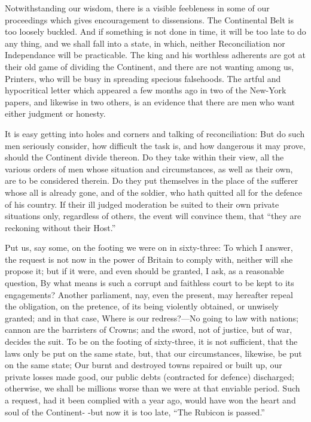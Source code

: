 \documentclass[12pt,oneside]{memoir}
\begin{document}
Notwithstanding our wisdom, there is a visible feebleness in some of our proceedings which gives encouragement to dissensions. The Continental Belt is too loosely buckled. And if something is not done in time, it will be too late to do any thing, and we shall fall into a state, in which, neither Reconciliation nor Independance will be practicable. The king and his worthless adherents are got at their old game of dividing the Continent, and there are not wanting among us, Printers, who will be busy in spreading specious falsehoods. The artful and hypocritical letter which appeared a few months ago in two of the New-York papers, and likewise in two others, is an evidence that there are men who want either judgment or honesty.

It is easy getting into holes and corners and talking of reconciliation: But do such men seriously consider, how difficult the task is, and how dangerous it may prove, should the Continent divide thereon. Do they take within their view, all the various orders of men whose situation and circumstances, as well as their own, are to be considered therein. Do they put themselves in the place of the sufferer whose all is already gone, and of the soldier, who hath quitted all for the defence of his country. If their ill judged moderation be suited to their own private situations only, regardless of others, the event will convince them, that ``they are reckoning without their Host.''

Put us, say some, on the footing we were on in sixty-three: To which I answer, the request is not now in the power of Britain to comply with, neither will she propose it; but if it were, and even should be granted, I ask, as a reasonable question, By what means is such a corrupt and faithless court to be kept to its engagements? Another parliament, nay, even the present, may hereafter repeal the obligation, on the pretence, of its being violently obtained, or unwisely granted; and in that case, Where is our redress?---No going to law with nations; cannon are the barristers of Crowns; and the sword, not of justice, but of war, decides the suit. To be on the footing of sixty-three, it is not sufficient, that the laws only be put on the same state, but, that our circumstances, likewise, be put on the same state; Our burnt and destroyed towns repaired or built up, our private losses made good, our public debts (contracted for defence) discharged; otherwise, we shall be millions worse than we were at that enviable period. Such a request, had it been complied with a year ago, would have won the heart and soul of the Continent- -but now it is too late, ``The Rubicon is passed.''
\end{document}

